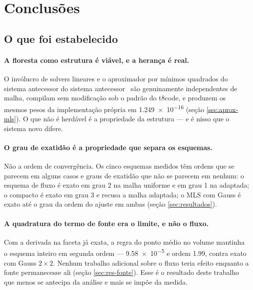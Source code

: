 \section{Conclusões}
\label{sec:conclusoes}


\subsection{O que foi estabelecido}

\paragraph{A floresta como estrutura é viável, e a herança é real.} O invólucro
de solvers lineares e o aproximador por mínimos quadrados do sistema antecessor
do sistema antecessor~\cite{sousa2019} são genuinamente independentes de malha, compilam sem modificação sob o padrão do
t8code, e produzem os mesmos pesos da implementação própria em \num{1.249e-16}
(seção \ref{sec:aprox-mls}). O que não é herdável é a propriedade da estrutura ---
e é nisso que o sistema novo difere.

\paragraph{O grau de exatidão é a propriedade que separa os esquemas.} Não a
ordem de convergência. Os cinco esquemas medidos têm ordens que se parecem em
alguns casos e graus de exatidão que não se parecem em nenhum: o esquema de fluxo
é exato em grau 2 na malha uniforme e em grau 1 na adaptada; o compacto é exato em
grau 3 e recusa a malha adaptada; o MLS com Gauss é exato até o grau da ordem do
ajuste em ambas (seção \ref{sec:resultados}).

\paragraph{A quadratura do termo de fonte era o limite, e não o fluxo.} Com a
derivada na faceta já exata, a regra do ponto médio no volume mantinha o esquema
inteiro em segunda ordem --- \num{9.58e-5} e ordem \num{1.99}, contra exato com
Gauss $2\times2$. Nenhum trabalho adicional sobre o fluxo teria efeito enquanto a
fonte permanecesse ali (seção \ref{sec:res-fonte}). Esse é o resultado deste
trabalho que menos se antecipa da análise e mais se impõe da medida.

